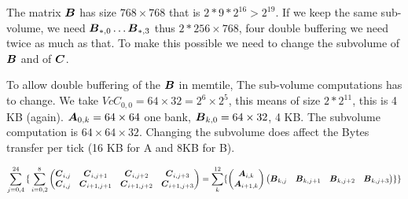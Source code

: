 \documentclass[journal]{IEEEtran}
\begin{document}
The matrix ${\boldsymbol B}$ has size $768 \times 768$ that is
$2*9*2^{16}>2^{19}$. If we keep the same sub-volume, we need
${\boldsymbol B}_{*,0} \dots {\boldsymbol B}_{*,3}$ thus $2*256 \times 768$, four double
buffering we need twice as much as that. To make this possible we need
to change the subvolume of ${\boldsymbol B}$ and of ${\boldsymbol C}$.

To allow double buffering of the ${\boldsymbol B}$ in memtile, The sub-volume
computations has to change. We take $Vc{C}_{0,0} = 64\times 32 = 2^6
\times 2^5$, this means of size $2*2^{11}$, this is 4 KB
(again). ${\boldsymbol A}_{0,k} = 64 \times 64$ one bank, ${\boldsymbol B}_{k,0} = 64
\times 32$, 4 KB. The subvolume computation is $64\times 64 \times
32$. Changing the subvolume does affect the Bytes transfer per tick
(16 KB for A and 8KB for B). 




{\small \begin{equation*}
    \sum_{j=0,4}^{24}
    { \{ } \sum_{i=0,2}^8 
  \begin{pmatrix}
    {\boldsymbol C}_{i,j}  & {\boldsymbol C}_{i,j+1}    & {\boldsymbol C}_{i,j+2}    &{\boldsymbol C}_{i,j+3} \\
    {\boldsymbol C}_{i,j}  & {\boldsymbol C}_{i+1,j+1}   & {\boldsymbol C}_{i+1,j+2}  & {\boldsymbol C}_{i+1,j+3} \\
  \end{pmatrix}    = \sum_k^{12}
  \{
  \begin{pmatrix}
    {\boldsymbol A}_{i,k}  \\
    {\boldsymbol A}_{i+1,k}   \\
  \end{pmatrix}  
  \begin{pmatrix}
    {\boldsymbol B}_{k,j}  &  {\boldsymbol B}_{k,j+1}  & {\boldsymbol B}_{k,j+2}  &{\boldsymbol B}_{k,j+3} \\
  \end{pmatrix}
  \}{ \}}    
\end{equation*}
}
\end{document}
